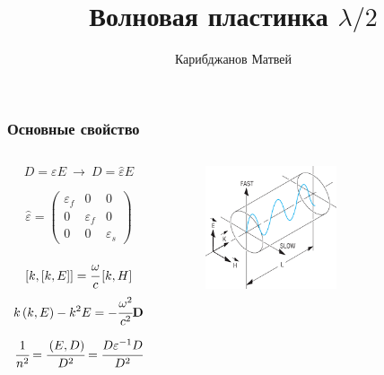 \documentclass[handout]{beamer}
\title{Волновая пластинка $\lambda/2$}
\author{Карибджанов Матвей}
\newcommand{\inner}[1]{\left( #1 \right)}
\newcommand{\insqr}[1]{\left[ #1 \right]}
\renewcommand{\epsilon}{\varepsilon}
\begin{document}
\begin{frame}%
    \titlepage
\end{frame}

\begin{frame}
    \frametitle{Основные свойство}
    \begin{columns}
        \begin{column}{0.5\textwidth}
            \begin{equation*}
                D = \epsilon E \ \to \ D = \hat \epsilon E
            \end{equation*}

            \begin{gather*}
                \hat \epsilon = 
                \begin{pmatrix}
                    \epsilon_f & 0 & 0 \\
                    0 & \epsilon_f & 0 \\
                    0 & 0 & \epsilon_s
                \end{pmatrix}
            \end{gather*}
            
            \begin{equation*}
                \insqr{k, \insqr{k, E}} = 
                \cfrac{\omega}{c} \insqr{k, H}
            \end{equation*}
            \begin{equation*}
                k \inner{k, E} - k^2 E 
                = - \cfrac{\omega^2}{c^2} \vb D
            \end{equation*}

            \begin{equation*}
                \cfrac{1}{n^2} = \cfrac{\inner{E, D}}{D^2} = \cfrac{D\epsilon^{-1}D}{D^2}    
            \end{equation*}
            
        \end{column}
        \begin{column}{0.5\textwidth}
            \begin{figure}[h]
                \centering
                \includegraphics[width=0.6\textwidth]{wp.png}
            \end{figure}
            

\end{column}
\end{columns}
\end{frame}
\end{document}
